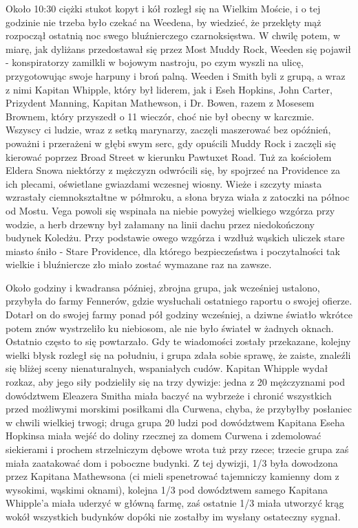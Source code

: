 Około 10:30 ciężki stukot kopyt i kół rozległ się na Wielkim Moście, i o tej godzinie nie trzeba było czekać na Weedena, by wiedzieć, że przeklęty mąż rozpoczął ostatnią noc swego bluźnierczego czarnoksięstwa. W chwilę potem, w miarę, jak dyliżans przedostawał się przez Most Muddy Rock, Weeden się pojawił - konspiratorzy zamilkli w bojowym nastroju, po czym wyszli na ulicę, przygotowując swoje harpuny i broń palną. Weeden i Smith byli z grupą, a wraz z nimi Kapitan Whipple, który był liderem, jak i Eseh Hopkins, John Carter, Prizydent Manning, Kapitan Mathewson, i Dr. Bowen, razem z Mosesem Brownem, który przyszedł o 11 wieczór, choć nie był obecny w karczmie. Wszyscy ci ludzie, wraz z setką marynarzy, zaczęli maszerować bez opóźnień, poważni i przerażeni w głębi swym serc, gdy opuścili Muddy Rock i zaczęli się kierować poprzez Broad Street w kierunku Pawtuxet Road. Tuż za kościołem Eldera Snowa niektórzy z mężczyzn odwrócili się, by spojrzeć na Providence za ich plecami, oświetlane gwiazdami wczesnej wiosny. Wieże i szczyty miasta wzrastały ciemnokształtne w półmroku, a słona bryza wiała z zatoczki na północ od Mostu. Vega powoli się wspinała na niebie powyżej wielkiego wzgórza przy wodzie, a herb drzewny był załamany na linii dachu przez niedokończony budynek Koledżu. Przy podstawie owego wzgórza i wzdłuż wąskich uliczek stare miasto śniło - Stare Providence, dla którego bezpieczeństwa i poczytalności tak wielkie i bluźniercze zło miało zostać wymazane raz na zawsze.

Około godziny i kwadransa później, zbrojna grupa, jak wcześniej ustalono, przybyła do farmy Fennerów, gdzie wysłuchali ostatniego raportu o swojej ofierze. Dotarł on do swojej farmy ponad pół godziny wcześniej, a dziwne światło wkrótce potem znów wystrzeliło ku niebiosom, ale nie było świateł w żadnych oknach. Ostatnio często to się powtarzało. Gdy te wiadomości zostały przekazane, kolejny wielki błysk rozległ się na południu, i grupa zdała sobie sprawę, że zaiste, znaleźli się bliżej sceny nienaturalnych, wspaniałych cudów. Kapitan Whipple wydał rozkaz, aby jego siły podzieliły się na trzy dywizje: jedna z 20 mężczyznami pod dowództwem Eleazera Smitha miała baczyć na wybrzeże i chronić wszystkich przed możliwymi morskimi posiłkami dla Curwena, chyba, że przybyłby posłaniec w chwili wielkiej trwogi; druga grupa 20 ludzi pod dowództwem Kapitana Eseha Hopkinsa miała wejść do doliny rzecznej za domem Curwena i zdemolować siekierami i prochem strzelniczym dębowe wrota tuż przy rzece; trzecie grupa zaś miała zaatakować dom i poboczne budynki. Z tej dywizji, 1/3 była dowodzona przez Kapitana Mathewsona (ci mieli spenetrować tajemniczy kamienny dom z wysokimi, wąskimi oknami), kolejna 1/3 pod dowództwem samego Kapitana Whipple'a miała uderzyć w główną farmę, zaś ostatnie 1/3 miała utworzyć krąg wokół wszystkich budynków dopóki nie zostałby im wysłany ostateczny sygnał. 

